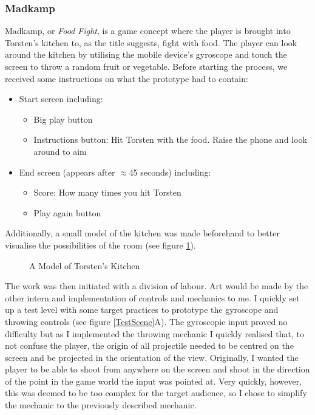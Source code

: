 \subsubsection{Madkamp}
Madkamp, or \textit{Food Fight}, is a game concept where the player is brought into Torsten's kitchen to, as the title suggests, fight with food. The player can look around the kitchen by utilising the mobile device's gyroscope and touch the screen to throw a random fruit or vegetable. \newline
Before starting the process, we received some instructions on what the prototype had to contain:
\begin{itemize}
  \item Start screen including:
  \begin{itemize}
    \item Big play button
    \item Instructions button: Hit Torsten with the food. Raise the phone and look around to aim
  \end{itemize}
  \item End screen (appears after $\approx$45 seconds) including:
  \begin{itemize}
    \item Score: How many times you hit Torsten
    \item Play again button
  \end{itemize}
\end{itemize}
Additionally, a small model of the kitchen was made beforehand to better visualise the possibilities of the room (see figure \ref{kitchenmodel}).
\begin{center}
  \begin{figure}[!htb]
    \noindent{}
    \caption{A Model of Torsten's Kitchen}
    \label{kitchenmodel}
  \end{figure}
\end{center}
The work was then initiated with a division of labour. Art would be made by the other intern and implementation of controls and mechanics to me. I quickly set up a test level with some target practices to prototype the gyroscope and throwing controls (see figure \ref{TestScene}A). The gyroscopic input proved no difficulty but as I implemented the throwing mechanic I quickly realised that, to not confuse the player, the origin of all projectile needed to be centred on the screen and be projected in the orientation of the view. Originally, I wanted the player to be able to shoot from anywhere on the screen and shoot in the direction of the point in the game world the input was pointed at. Very quickly, however, this was deemed to be too complex for the target audience, so I chose to simplify the mechanic to the previously described mechanic.

